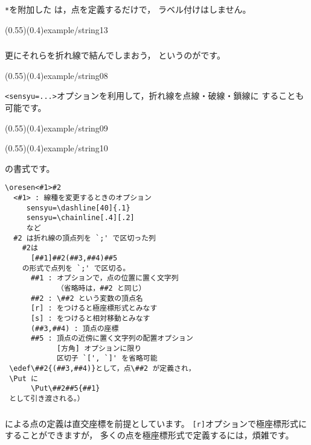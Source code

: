 \subsubsection{\texorpdfstring{}{tenretu*}}
\texttt{*}を附加した  は，点を定義するだけで，
ラベル付けはしません。

(0.55)(0.4){example/string13}

\subsubsection{\texorpdfstring{}{oresen}}
更にそれらを折れ線で結んでしまおう，
というのがです。

(0.55)(0.4){example/string08}

\verb/<sensyu=...>/オプションを利用して，折れ線を点線・破線・鎖線に
することも可能です。

\showexample[線種の変更（鎖線）](0.55)(0.4){example/string09}

\showexample[線種の変更（破線）](0.55)(0.4){example/string10}

の書式です。

\begin{boxnote}
\begin{verbatim}
\oresen<#1>#2
  <#1> : 線種を変更するときのオプション
     sensyu=\dashline[40]{.1}
     sensyu=\chainline[.4][.2]
     など
  #2 は折れ線の頂点列を `;' で区切った列
    #2は
      [##1]##2(##3,##4)##5
    の形式で点列を `;' で区切る。
      ##1 : オプションで，点の位置に置く文字列
            （省略時は，##2 と同じ）
      ##2 : \##2 という変数の頂点名
      [r] : をつけると極座標形式とみなす
      [s] : をつけると相対移動とみなす
      (##3,##4) : 頂点の座標
      ##5 : 頂点の近傍に置く文字列の配置オプション
            [方角] オプションに限り
            区切子 `[', `]' を省略可能
 \edef\##2{(##3,##4)}として，点\##2 が定義され，
 \Put に
      \Put\##2##5{##1}
 として引き渡される。）
\end{verbatim}
\end{boxnote}

\subsubsection{\texorpdfstring{}{rtenretu}}
による点の定義は直交座標を前提としています。
\verb+[r]+オプションで極座標形式にすることができますが，
多くの点を極座標形式で定義するには，煩雑です。


